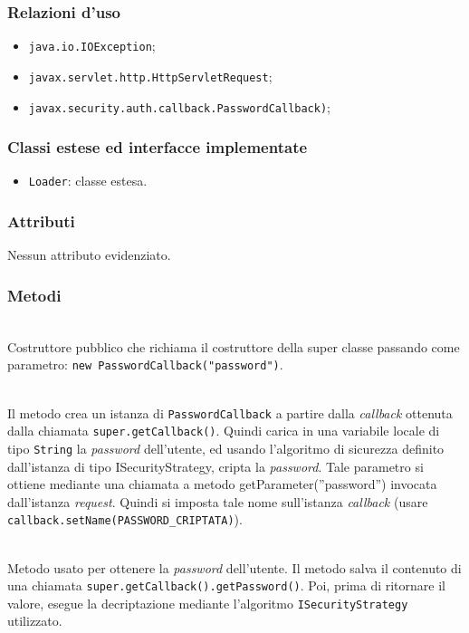 \subsubsection*{Relazioni d'uso}
\begin{itemize}
	\item \texttt{java.io.IOException};
	\item \texttt{javax.servlet.http.HttpServletRequest};
	\item \texttt{javax.security.auth.callback.PasswordCallback)};
\end{itemize}

\subsubsection*{Classi estese ed interfacce implementate}

\begin{itemize}
	\item \texttt{Loader}: classe estesa.
\end{itemize}

\subsubsection*{Attributi}

Nessun attributo evidenziato.

\subsubsection*{Metodi}
\begin{description}
	\item{}\\
	Costruttore pubblico che richiama il costruttore della super classe passando come parametro: \verb|new PasswordCallback("password")|.
	
	\item{}\\
	Il metodo crea un istanza di \texttt{PasswordCallback} a partire dalla \textit{callback} ottenuta dalla chiamata \verb|super.getCallback()|. Quindi carica in una variabile locale di tipo \texttt{String} la \textit{password} dell'utente, ed usando l'algoritmo di sicurezza definito dall'istanza di tipo ISecurityStrategy, cripta la \textit{password}. Tale parametro si ottiene mediante una chiamata a metodo getParameter(''password'') invocata dall'istanza \textit{request}. Quindi si imposta tale nome sull'istanza \textit{callback} (usare \verb|callback.setName(PASSWORD_CRIPTATA)|).
	
	\item{}\\
	Metodo usato per ottenere la \textit{password} dell'utente. Il metodo salva il contenuto di una chiamata \verb|super.getCallback().getPassword()|. Poi, prima di ritornare il valore, esegue la decriptazione mediante l'algoritmo \texttt{ISecurityStrategy} utilizzato.
	
\end{description}

